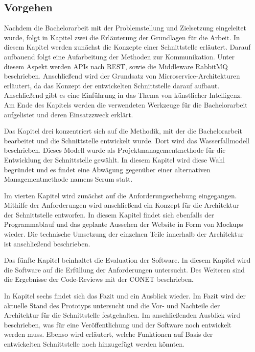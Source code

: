 \subsection{Vorgehen}
Nachdem die Bachelorarbeit mit der Problemstellung und Zielsetzung eingeleitet wurde, folgt in Kapitel zwei die Erläuterung der Grundlagen für die Arbeit. In diesem Kapitel werden zunächst die Konzepte einer Schnittstelle erläutert. Darauf aufbauend folgt eine Aufarbeitung der Methoden zur Kommunikation. Unter diesem Aspekt werden APIs nach REST, sowie die Middleware RabbitMQ beschrieben. Anschließend wird der Grundsatz von Microservice-Architekturen erläutert, da das Konzept der entwickelten Schnittstelle darauf aufbaut. Anschließend gibt es eine Einführung in das Thema von künstlicher Intelligenz. Am Ende des Kapitels werden die verwendeten Werkzeuge für die Bachelorarbeit aufgelistet und deren Einsatzzweck erklärt.

Das Kapitel drei konzentriert sich auf die Methodik, mit der die Bachelorarbeit bearbeitet und die Schnittstelle entwickelt wurde. Dort wird das Wasserfallmodell beschrieben. Dieses Modell wurde als Projektmanagementmethode für die Entwicklung der Schnittstelle gewählt. In diesem Kapitel wird diese Wahl begründet und es findet eine Abwägung gegenüber einer alternativen Managementmethode namens \glqq Scrum\grqq{} statt.

Im vierten Kapitel wird zunächst auf die Anforderungserhebung eingegangen. Mithilfe der Anforderungen wird anschließend ein Konzept für die Architektur der Schnittstelle entworfen. In diesem Kapitel findet sich ebenfalls der Programmablauf und das geplante Aussehen der Website in Form von Mockups wieder. Die technische Umsetzung der einzelnen Teile innerhalb der Architektur ist anschließend beschrieben.

Das fünfte Kapitel beinhaltet die Evaluation der Software. In diesem Kapitel wird die Software auf die Erfüllung der Anforderungen untersucht. Des Weiteren sind die Ergebnisse der Code-Reviews mit der CONET beschrieben.

In Kapitel sechs findet sich das Fazit und ein Ausblick wieder. Im Fazit wird der aktuelle Stand des Prototyps untersucht und die Vor- und Nachteile der Architektur für die Schnittstelle festgehalten. Im anschließenden Ausblick wird beschrieben, was für eine Veröffentlichung und der Software noch entwickelt werden muss. Ebenso wird erläutert, welche Funktionen auf Basis der entwickelten Schnittstelle noch hinzugefügt werden könnten.

